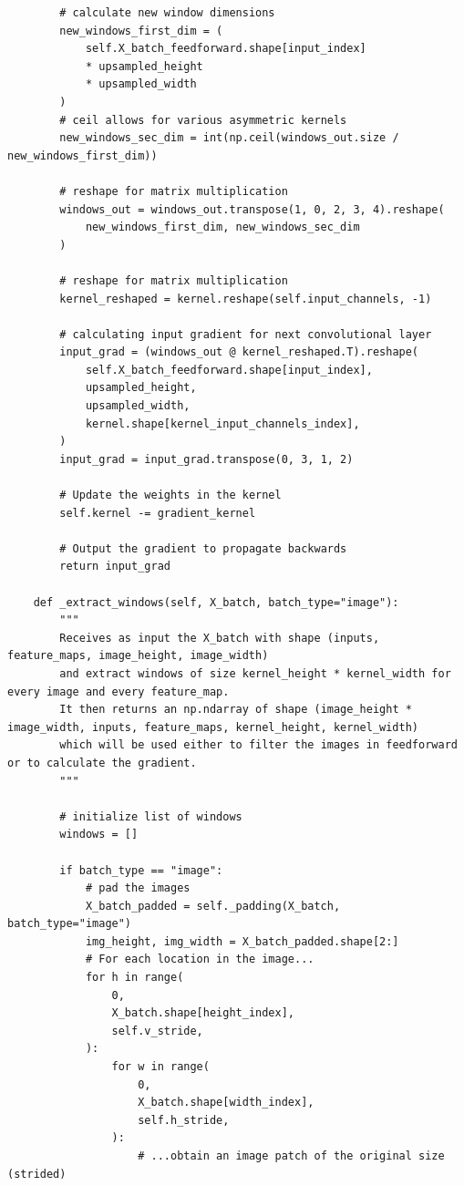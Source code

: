 \documentclass[%
oneside,                 %
final,                   %
10pt]{article}
\begin{document}
\begin{verbatim}
        # calculate new window dimensions
        new_windows_first_dim = (
            self.X_batch_feedforward.shape[input_index]
            * upsampled_height
            * upsampled_width
        )
        # ceil allows for various asymmetric kernels
        new_windows_sec_dim = int(np.ceil(windows_out.size / new_windows_first_dim))

        # reshape for matrix multiplication
        windows_out = windows_out.transpose(1, 0, 2, 3, 4).reshape(
            new_windows_first_dim, new_windows_sec_dim
        )

        # reshape for matrix multiplication
        kernel_reshaped = kernel.reshape(self.input_channels, -1)

        # calculating input gradient for next convolutional layer
        input_grad = (windows_out @ kernel_reshaped.T).reshape(
            self.X_batch_feedforward.shape[input_index],
            upsampled_height,
            upsampled_width,
            kernel.shape[kernel_input_channels_index],
        )
        input_grad = input_grad.transpose(0, 3, 1, 2)

        # Update the weights in the kernel
        self.kernel -= gradient_kernel

        # Output the gradient to propagate backwards
        return input_grad

    def _extract_windows(self, X_batch, batch_type="image"):
        """
        Receives as input the X_batch with shape (inputs, feature_maps, image_height, image_width)
        and extract windows of size kernel_height * kernel_width for every image and every feature_map.
        It then returns an np.ndarray of shape (image_height * image_width, inputs, feature_maps, kernel_height, kernel_width)
        which will be used either to filter the images in feedforward or to calculate the gradient.
        """

        # initialize list of windows
        windows = []

        if batch_type == "image":
            # pad the images
            X_batch_padded = self._padding(X_batch, batch_type="image")
            img_height, img_width = X_batch_padded.shape[2:]
            # For each location in the image...
            for h in range(
                0,
                X_batch.shape[height_index],
                self.v_stride,
            ):
                for w in range(
                    0,
                    X_batch.shape[width_index],
                    self.h_stride,
                ):
                    # ...obtain an image patch of the original size (strided)


\end{verbatim}
\end{document}
